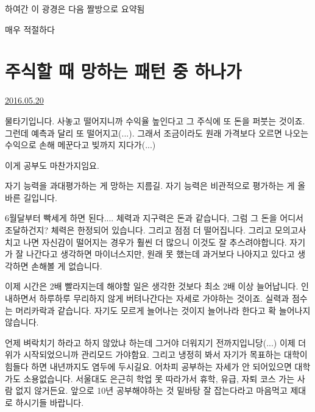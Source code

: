 하여간 이 광경은 다음 짤방으로 요약됨
\vspace{5mm}

매우 적절하다




\section{주식할 때 망하는 패턴 중 하나가}
\href{https://www.kockoc.com/Apoc/784654}{2016.05.20}

\vspace{5mm}

물타기입니다.
사놓고 떨어지니까 수익율 높인다고 그 주식에 또 돈을 퍼붓는 것이죠.
그런데 예측과 달리 또 떨어지고(...). 그래서 조금이라도 원래 가격보다 오르면 나오는 수익으로 손해 메꾼다고 빚까지 지다가(...)
\vspace{5mm}

이게 공부도 마찬가지임요.
\vspace{5mm}

자기 능력을 과대평가하는 게 망하는 지름길.
자기 능력은 비관적으로 평가하는 게 올바른 길입니다.
\vspace{5mm}

6월달부터 빡세게 하면 된다.... 체력과 지구력은 돈과 같습니다, 그럼 그 돈을 어디서 조달하건지?
체력은 한정되어 있습니다. 그리고 점점 더 떨어집니다.
그리고 모의고사 치고 나면 자신감이 떨어지는 경우가 훨씬 더 많으니 이것도 잘 추스려야합니다.
자기가 잘 나간다고 생각하면 마이너스지만, 원래 못 했는데 과거보다 나아지고 있다고 생각하면 손해볼 게 없습니다.
\vspace{5mm}

이제 시간은 2배 빨라지는데 해야할 일은 생각한 것보다 최소 2배 이상 늘어납니다.
인내하면서 하루하루 무리하지 않게 버텨나간다는 자세로 가야하는 것이죠.
실력과 점수는 머리카락과 같습니다. 자기도 모르게 늘어나는 것이지 늘어나라 한다고 확 늘어나지 않습니다.
\vspace{5mm}

언제 벼락치기 하라고 하지 않았냐 하는데 그거야 더워지기 전까지입니당(...) 이제 더위가 시작되었으니까 관리모드 가야함요.
그리고 냉정히 봐서 자기가 목표하는 대학이 힘들다 하면 내년까지도 염두에 두시길요.
어차피 공부하는 자세가 안 되어있으면 대학 가도 소용없습니다. 서울대도 은근히 학업 못 따라가서 휴학, 유급, 자퇴 코스 가는 사람 없지 않거든요.
앞으로 10년 공부해야하는 것 밑바탕 잘 잡는다라고 마음먹고 제대로 하시기들 바랍니다.
\vspace{5mm}






